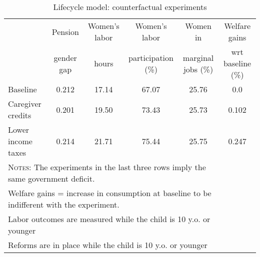 \begin{table}[htbp]\caption{Lifecycle model: counterfactual experiments}\label{table:experiments}\centering\footnotesize\begin{tabular}{lccccc} \toprule & Pension & Women's labor & Women's labor & Women in &  Welfare gains  \\&gender gap &hours &  participation  (\%) & marginal jobs (\%)  & wrt baseline (\%)  \\\midrule    Baseline                                   &0.212&17.14&67.07&25.76& 0.0\\ Caregiver credits                          &0.201&19.50&73.43&25.73&0.102\\ Lower income taxes                         &0.214&21.71&75.44&25.75&0.247\\ \bottomrule\multicolumn{5}{l}{\textsc{Notes:} The experiments in the last three rows imply the same government deficit. }\\\multicolumn{5}{l}{Welfare gains = increase in consumption at baseline to be indifferent with the experiment. }\\\multicolumn{5}{l}{Labor outcomes are measured while the child is 10 y.o. or younger }\\\multicolumn{5}{l}{Reforms are in place while the child is 10 y.o. or younger }\\\end{tabular} 
      \end{table}